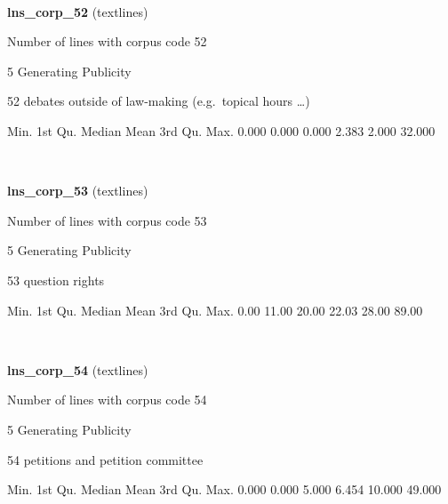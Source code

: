 \documentclass[]{article}
\newenvironment{Shaded}{\begin{snugshade}}{\end{snugshade}}
\newcommand{\FloatTok}[1]{\textcolor[rgb]{0.00,0.00,0.81}{{#1}}}
\newcommand{\NormalTok}[1]{{#1}}
\begin{document}
~

\vspace{1em}

\textbf{lns\_corp\_52} (textlines)

Number of lines with corpus code 52

5 Generating Publicity

52 debates outside of law-making (e.g.~topical hours \ldots{})

\begin{Shaded}
\begin{Highlighting}[]
   \NormalTok{Min. 1st Qu.  Median    Mean 3rd Qu.    Max. }
  \FloatTok{0.000}   \FloatTok{0.000}   \FloatTok{0.000}   \FloatTok{2.383}   \FloatTok{2.000}  \FloatTok{32.000} 
\end{Highlighting}
\end{Shaded}

~

\vspace{1em}

\textbf{lns\_corp\_53} (textlines)

Number of lines with corpus code 53

5 Generating Publicity

53 question rights

\begin{Shaded}
\begin{Highlighting}[]
   \NormalTok{Min. 1st Qu.  Median    Mean 3rd Qu.    Max. }
   \FloatTok{0.00}   \FloatTok{11.00}   \FloatTok{20.00}   \FloatTok{22.03}   \FloatTok{28.00}   \FloatTok{89.00} 
\end{Highlighting}
\end{Shaded}

~

\vspace{1em}

\textbf{lns\_corp\_54} (textlines)

Number of lines with corpus code 54

5 Generating Publicity

54 petitions and petition committee

\begin{Shaded}
\begin{Highlighting}[]
   \NormalTok{Min. 1st Qu.  Median    Mean 3rd Qu.    Max. }
  \FloatTok{0.000}   \FloatTok{0.000}   \FloatTok{5.000}   \FloatTok{6.454}  \FloatTok{10.000}  \FloatTok{49.000} 
\end{Highlighting}
\end{Shaded}
\end{document}
